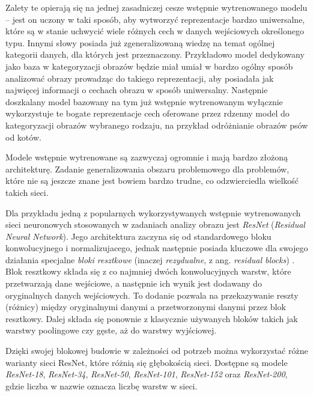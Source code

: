 Zalety te opierają się na jednej zasadniczej cesze wstępnie wytrenowanego modelu -- jest on uczony w taki sposób, aby wytworzyć reprezentacje bardzo uniwersalne, które są w stanie uchwycić wiele różnych cech w danych wejściowych określonego typu.
Innymi słowy posiada już zgeneralizowaną wiedzę na temat ogólnej kategorii danych, dla których jest przeznaczony.
Przykładowo model dedykowany jako baza w kategoryzacji obrazów będzie miał umiał w bardzo ogólny sposób analizować obrazy prowadząc do takiego reprezentacji, aby posiadała jak najwięcej informacji o cechach obrazu w sposób uniwersalny.
Następnie doszkalany model bazowany na tym już wstępnie wytrenowanym wyłącznie wykorzystuje te bogate reprezentacje cech oferowane przez rdzenny model do kategoryzacji obrazów wybranego rodzaju, na przykład odróżnianie obrazów psów od kotów.

Modele wstępnie wytrenowane są zazwyczaj ogromnie i mają bardzo złożoną architekturę.
Zadanie generalizowania obszaru problemowego dla problemów, które nie są jeszcze znane jest bowiem bardzo trudne, co odzwierciedla wielkość takich sieci.

Dla przykładu jedną z popularnych wykorzystywanych wstępnie wytrenowanych sieci neuronowych stosowanych w zadaniach analizy obrazu jest \emph{ResNet} (\emph{Residual Neural Network}).
Jego architektura zaczyna się od standardowego bloku konwolucyjnego i normalizujacego, jednak następnie posiada kluczowe dla swojego działania specjalne \emph{bloki resztkowe} (inaczej \emph{rezydualne}, z ang. \emph{residual blocks}) \cite{li2016demystifying}.
Blok resztkowy składa się z co najmniej dwóch konwolucyjnych warstw, które przetwarzają dane wejściowe, a następnie ich wynik jest dodawany do oryginalnych danych wejściowych.
To dodanie pozwala na przekazywanie reszty (różnicy) między oryginalnymi danymi a przetworzonymi danymi przez blok resztkowy.
Dalej składa się ponownie z klasycznie używanych bloków takich jak warstwy poolingowe czy gęste, aż do warstwy wyjściowej.

Dzięki swojej blokowej budowie w zależności od potrzeb można wykorzystać różne warianty sieci ResNet, które różnią się głębokością sieci.
Dostępne są modele \emph{ResNet-18}, \emph{ResNet-34}, \emph{ResNet-50}, \emph{ResNet-101}, \emph{ResNet-152} oraz \emph{ResNet-200}, gdzie liczba w nazwie oznacza liczbę warstw w sieci.
